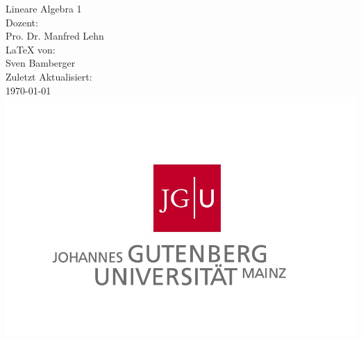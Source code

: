 \begin{titlepage}
\center
\Large Lineare Algebra 1 \\[2em]
Dozent:\\Pro. Dr. Manfred Lehn \\[2em]
\LaTeX{} von:\\Sven Bamberger\\[2em]
Zuletzt Aktualisiert:\\\today\\
\includegraphics[scale=.2]{front/pics/Logo.jpg}\\\quad\\
\end{titlepage}